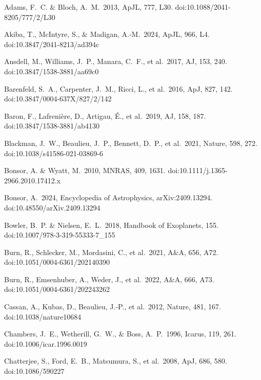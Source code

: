 \documentclass[useAMS,usenatbib]{mn2e}
\begin{document}
\begin{thebibliography}{99}

 
 Adams, F.~C. \& Bloch, A.~M.\ 2013, ApJL, 777, L30. doi:10.1088/2041-8205/777/2/L30 
 
 Akiba, T., McIntyre, S., \& Madigan, A.-M.\ 2024, ApJL, 966, L4. doi:10.3847/2041-8213/ad394c

 Ansdell, M., Williams, J.~P., Manara, C.~F., et al.\ 2017, AJ, 153, 240. doi:10.3847/1538-3881/aa69c0

 Barenfeld, S.~A., Carpenter, J.~M., Ricci, L., et al.\ 2016, ApJ, 827, 142. doi:10.3847/0004-637X/827/2/142

 Baron, F., Lafreni{\`e}re, D., Artigau, {\'E}., et al.\ 2019, AJ, 158, 187. doi:10.3847/1538-3881/ab4130

 Blackman, J.~W., Beaulieu, J.~P., Bennett, D.~P., et al.\ 2021, Nature, 598, 272. doi:10.1038/s41586-021-03869-6

 Bonsor, A. \& Wyatt, M.\ 2010, MNRAS, 409, 1631. doi:10.1111/j.1365-2966.2010.17412.x

 Bonsor, A.\ 2024, Encyclopedia of Astrophysics, arXiv:2409.13294. doi:10.48550/arXiv.2409.13294

 Bowler, B.~P. \& Nielsen, E.~L.\ 2018, Handbook of Exoplanets, 155. doi:10.1007/978-3-319-55333-7\_155

 Burn, R., Schlecker, M., Mordasini, C., et al.\ 2021, A\&A, 656, A72. doi:10.1051/0004-6361/202140390

 Burn, R., Emsenhuber, A., Weder, J., et al.\ 2022, A\&A, 666, A73. doi:10.1051/0004-6361/202243262

 Cassan, A., Kubas, D., Beaulieu, J.-P., et al.\ 2012, Nature, 481, 167. doi:10.1038/nature10684

 Chambers, J.~E., Wetherill, G.~W., \& Boss, A.~P.\ 1996, Icarus, 119, 261. doi:10.1006/icar.1996.0019

 Chatterjee, S., Ford, E.~B., Matsumura, S., et al.\ 2008, ApJ, 686, 580. doi:10.1086/590227


\end{thebibliography}
\end{document}
